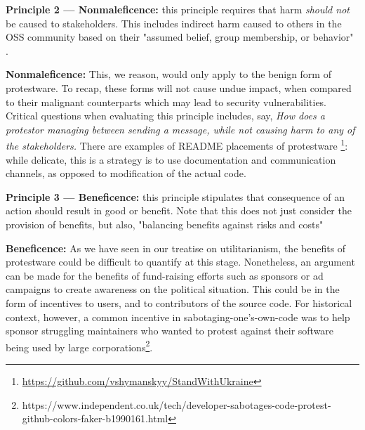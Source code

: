 \documentclass[journal,twocolumn]{IEEEtran}
\begin{document}

\begin{tcolorbox}
    \textbf{Principle 2 --- Nonmaleficence:} this principle requires that harm \textit{should not} be caused to stakeholders. This includes indirect harm caused to others in the OSS community based on their "assumed belief, group membership, or behavior" \cite{coghlan}.
\end{tcolorbox}

\textbf{Nonmaleficence:} This, we reason, would only apply to the benign form of protestware. To recap, these forms will not cause undue impact, when compared to their malignant counterparts which may lead to security vulnerabilities. 
Critical questions when evaluating this principle includes, say, \textit{How does a protestor managing between sending a message, while not causing harm to any of the stakeholders.} 
There are examples of README placements of protestware \footnote{\url{https://github.com/vshymanskyy/StandWithUkraine}}: while delicate, this is a strategy is to use documentation and communication channels, as opposed to modification of the actual code.


\begin{tcolorbox}
    \textbf{Principle 3 --- Beneficence:} this principle stipulates that consequence of an action should result in good or benefit. Note that this does not just consider the provision of benefits, but also, "balancing benefits against risks and costs" \cite{Beauchamp1994}
\end{tcolorbox}

\textbf{Beneficence:} As we have seen in our treatise on utilitarianism, the benefits of protestware could be difficult to quantify at this stage. Nonetheless, an argument can be made for the benefits of fund-raising efforts such as sponsors or ad campaigns to create awareness on the political situation. 
This could be in the form of incentives to users, and to contributors of the source code.
For historical context, however, a common incentive in sabotaging-one's-own-code was to help sponsor struggling maintainers who wanted to protest against their software being used by large corporations\footnote{https://www.independent.co.uk/tech/developer-sabotages-code-protest-github-colors-faker-b1990161.html}.
\end{document}
